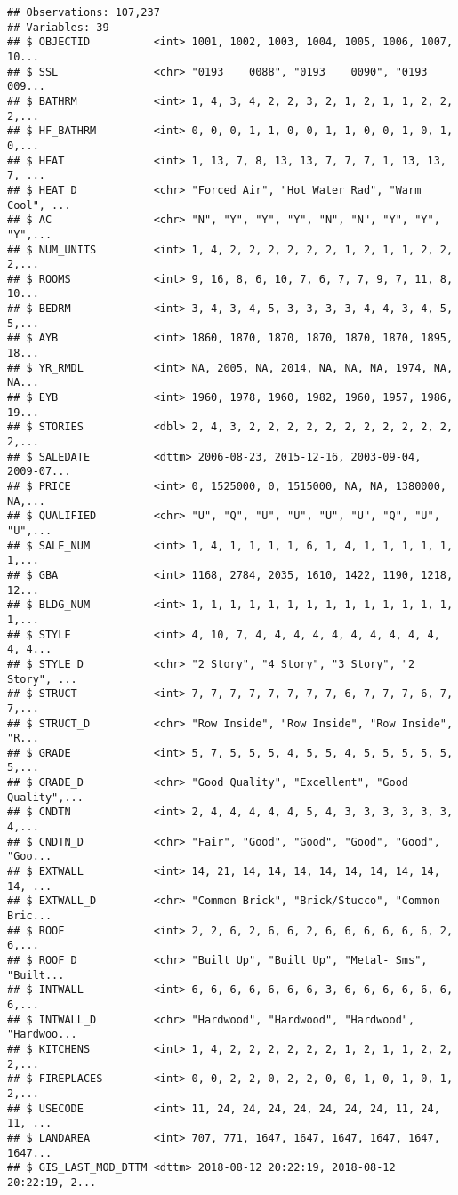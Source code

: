 \documentclass[]{article}
\begin{document}
\begin{verbatim}
## Observations: 107,237
## Variables: 39
## $ OBJECTID          <int> 1001, 1002, 1003, 1004, 1005, 1006, 1007, 10...
## $ SSL               <chr> "0193    0088", "0193    0090", "0193    009...
## $ BATHRM            <int> 1, 4, 3, 4, 2, 2, 3, 2, 1, 2, 1, 1, 2, 2, 2,...
## $ HF_BATHRM         <int> 0, 0, 0, 1, 1, 0, 0, 1, 1, 0, 0, 1, 0, 1, 0,...
## $ HEAT              <int> 1, 13, 7, 8, 13, 13, 7, 7, 7, 1, 13, 13, 7, ...
## $ HEAT_D            <chr> "Forced Air", "Hot Water Rad", "Warm Cool", ...
## $ AC                <chr> "N", "Y", "Y", "Y", "N", "N", "Y", "Y", "Y",...
## $ NUM_UNITS         <int> 1, 4, 2, 2, 2, 2, 2, 2, 1, 2, 1, 1, 2, 2, 2,...
## $ ROOMS             <int> 9, 16, 8, 6, 10, 7, 6, 7, 7, 9, 7, 11, 8, 10...
## $ BEDRM             <int> 3, 4, 3, 4, 5, 3, 3, 3, 3, 4, 4, 3, 4, 5, 5,...
## $ AYB               <int> 1860, 1870, 1870, 1870, 1870, 1870, 1895, 18...
## $ YR_RMDL           <int> NA, 2005, NA, 2014, NA, NA, NA, 1974, NA, NA...
## $ EYB               <int> 1960, 1978, 1960, 1982, 1960, 1957, 1986, 19...
## $ STORIES           <dbl> 2, 4, 3, 2, 2, 2, 2, 2, 2, 2, 2, 2, 2, 2, 2,...
## $ SALEDATE          <dttm> 2006-08-23, 2015-12-16, 2003-09-04, 2009-07...
## $ PRICE             <int> 0, 1525000, 0, 1515000, NA, NA, 1380000, NA,...
## $ QUALIFIED         <chr> "U", "Q", "U", "U", "U", "U", "Q", "U", "U",...
## $ SALE_NUM          <int> 1, 4, 1, 1, 1, 1, 6, 1, 4, 1, 1, 1, 1, 1, 1,...
## $ GBA               <int> 1168, 2784, 2035, 1610, 1422, 1190, 1218, 12...
## $ BLDG_NUM          <int> 1, 1, 1, 1, 1, 1, 1, 1, 1, 1, 1, 1, 1, 1, 1,...
## $ STYLE             <int> 4, 10, 7, 4, 4, 4, 4, 4, 4, 4, 4, 4, 4, 4, 4...
## $ STYLE_D           <chr> "2 Story", "4 Story", "3 Story", "2 Story", ...
## $ STRUCT            <int> 7, 7, 7, 7, 7, 7, 7, 7, 6, 7, 7, 7, 6, 7, 7,...
## $ STRUCT_D          <chr> "Row Inside", "Row Inside", "Row Inside", "R...
## $ GRADE             <int> 5, 7, 5, 5, 5, 4, 5, 5, 4, 5, 5, 5, 5, 5, 5,...
## $ GRADE_D           <chr> "Good Quality", "Excellent", "Good Quality",...
## $ CNDTN             <int> 2, 4, 4, 4, 4, 4, 5, 4, 3, 3, 3, 3, 3, 3, 4,...
## $ CNDTN_D           <chr> "Fair", "Good", "Good", "Good", "Good", "Goo...
## $ EXTWALL           <int> 14, 21, 14, 14, 14, 14, 14, 14, 14, 14, 14, ...
## $ EXTWALL_D         <chr> "Common Brick", "Brick/Stucco", "Common Bric...
## $ ROOF              <int> 2, 2, 6, 2, 6, 6, 2, 6, 6, 6, 6, 6, 6, 2, 6,...
## $ ROOF_D            <chr> "Built Up", "Built Up", "Metal- Sms", "Built...
## $ INTWALL           <int> 6, 6, 6, 6, 6, 6, 6, 3, 6, 6, 6, 6, 6, 6, 6,...
## $ INTWALL_D         <chr> "Hardwood", "Hardwood", "Hardwood", "Hardwoo...
## $ KITCHENS          <int> 1, 4, 2, 2, 2, 2, 2, 2, 1, 2, 1, 1, 2, 2, 2,...
## $ FIREPLACES        <int> 0, 0, 2, 2, 0, 2, 2, 0, 0, 1, 0, 1, 0, 1, 2,...
## $ USECODE           <int> 11, 24, 24, 24, 24, 24, 24, 24, 11, 24, 11, ...
## $ LANDAREA          <int> 707, 771, 1647, 1647, 1647, 1647, 1647, 1647...
## $ GIS_LAST_MOD_DTTM <dttm> 2018-08-12 20:22:19, 2018-08-12 20:22:19, 2...
\end{verbatim}
\end{document}
